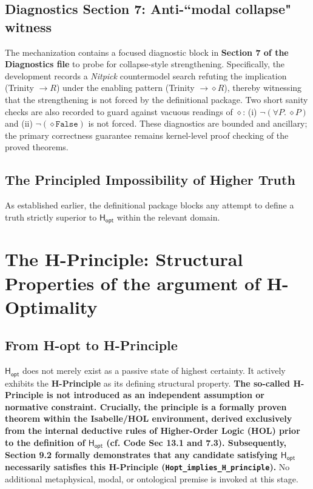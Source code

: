 \documentclass[a4paper, 11pt]{article}
\theoremstyle{plain}
\theoremstyle{definition}
\newcommand{\Hopt}{\mathsf{H_{opt}}}       %
\begin{document}
\subsection{Diagnostics Section 7: Anti-``modal collapse" witness}
The mechanization contains a focused diagnostic block in \textbf{Section 7 of the Diagnostics file} to probe for collapse-style strengthening.
Specifically, the development records a \textit{Nitpick} countermodel search refuting the implication (Trinity $\rightarrow R$) under the enabling pattern (Trinity $\rightarrow \diamond R$), thereby witnessing that the strengthening is not forced by the definitional package.
Two short sanity checks are also recorded to guard against vacuous readings of $\diamond$: (i) $\neg(\forall P.\ \diamond P)$ and (ii) $\neg(\diamond \texttt{False})$ is not forced.
These diagnostics are bounded and ancillary; the primary correctness guarantee remains kernel-level proof checking of the proved theorems.

\subsection{The Principled Impossibility of Higher Truth}
\label{sec:impossibility_higher_truth}

As established earlier, the definitional package blocks any attempt to define a truth strictly superior to $\Hopt$ within the relevant domain.

\section{The H-Principle: Structural Properties of the argument of H-Optimality}
\label{sec:h_principle_structural}

\subsection{From H-opt to H-Principle}
\label{subsec:Hopt_to_principle}
$\Hopt$ does not merely exist as a passive state of highest certainty. It actively exhibits the \textbf{H-Principle} as its defining structural property. \textbf{The so-called H-Principle is not introduced as an independent assumption or normative constraint. Crucially, the principle is a formally proven theorem within the Isabelle/HOL environment, derived exclusively from the internal deductive rules of Higher-Order Logic (HOL) prior to the definition of $\Hopt$ (cf. Code Sec 13.1 and 7.3). Subsequently, Section 9.2 formally demonstrates that any candidate satisfying $\Hopt$ necessarily satisfies this H-Principle (\texttt{Hopt\_implies\_H\_principle}).} No additional metaphysical, modal, or ontological premise is invoked at this stage.
\end{document}

